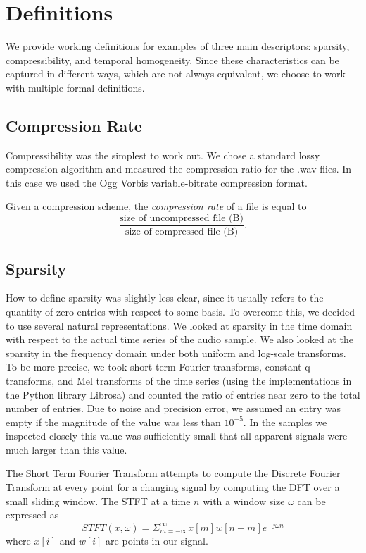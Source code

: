 \documentclass{sig-alternate-05-2015}
\let\realbfseries=\bfseries
\def\bfseries{\realbfseries\boldmath}
\newenvironment{definition}[1][Definition]{\begin{trivlist}
\item[\hskip \labelsep {\bfseries #1}]}{\end{trivlist}}
\begin{document}
\section{Definitions}
\label{sec:definitions}
We provide working definitions for examples of three main descriptors: sparsity, compressibility, and temporal homogeneity. Since these characteristics can be captured in different ways, which are not always equivalent, we choose to work with multiple formal definitions.

\subsection{Compression Rate}
Compressibility was the simplest to work out. We chose a standard lossy compression algorithm and measured the compression ratio for the .wav flies. In this case we used the Ogg Vorbis variable-bitrate compression format.

\begin{definition}
Given a compression scheme, the {\em compression rate} of a file is equal to \[\frac{\text{size of uncompressed file (B)}}{\text{size of compressed file (B)}}.\]  
\end{definition}

\subsection{Sparsity}

How to define sparsity was slightly less clear, since it usually refers to the quantity of zero entries with respect to some basis. To overcome this, we decided to use several natural representations. We looked at sparsity in the time domain with respect to the actual time series of the audio sample. We also looked at the sparsity in the frequency domain under both uniform and log-scale transforms. To be more precise, we took short-term Fourier transforms, constant q transforms, and Mel transforms of the time series (using the implementations in the Python library Librosa\cite{mcfee2015librosa}) and counted the ratio of entries near zero to the total number of entries. Due to noise and precision error, we assumed an entry was empty if the magnitude of the value was less than $10^{-5}$. In the samples we inspected closely this value was sufficiently small that all apparent signals were much larger than this value.

The Short Term Fourier Transform attempts to compute the Discrete Fourier Transform at every point for a changing signal by computing the DFT over a small sliding window. The STFT at a time $n$ with a window size $\omega$ can be expressed as $$STFT \left(x,\omega \right) = \Sigma_{m=-\infty}^\infty x[m]w[n-m]e^{-j\omega n}$$ where $x[i]$ and $w[i]$ are points in our signal\cite{STFT}.
\end{document}
